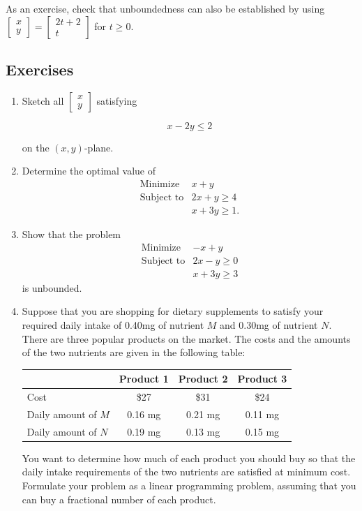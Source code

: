 As an exercise, check that unboundedness can also be established by
using
\(\begin{bmatrix} x \\ y\end{bmatrix} = \begin{bmatrix} 2t+2 \\ t\end{bmatrix}\)
for \(t \geq 0\).

\subsection*{Exercises}\label{exercises}

\begin{enumerate}
\def\labelenumi{\arabic{enumi}.}
\item
  Sketch all \(\begin{bmatrix} x \\ y \end{bmatrix}\) satisfying

  \begin{equation*}
  x - 2y \leq 2
  \end{equation*}

  on the \((x,y)\)-plane.
\item
  Determine the optimal value of \[
  \begin{array}{rl}
  \text{Minimize} & x + y \\
  \text{Subject to} &  2x + y \geq 4 \\
  & x + 3y \geq 1.
  \end{array}
  \]
\item
  Show that the problem \[
  \begin{array}{rl}
  \text{Minimize} & -x + y \\
  \text{Subject to} &  2x - y \geq 0 \\
  & x + 3y \geq 3
  \end{array}
  \] is unbounded.
\item
  Suppose that you are shopping for dietary supplements to satisfy your
  required daily intake of 0.40mg of nutrient \(M\) and 0.30mg of
  nutrient \(N\). There are three popular products on the market. The
  costs and the amounts of the two nutrients are given in the following
  table:

  \begin{longtable}[]{@{}lccc@{}}
  \toprule
  & Product 1 & Product 2 & Product 3\tabularnewline
  \midrule
  \endhead
  Cost & \$27 & \$31 & \$24\tabularnewline
  Daily amount of \(M\) & 0.16 mg & 0.21 mg & 0.11 mg\tabularnewline
  Daily amount of \(N\) & 0.19 mg & 0.13 mg & 0.15 mg\tabularnewline
  \bottomrule
  \end{longtable}

  You want to determine how much of each product you should buy so that
  the daily intake requirements of the two nutrients are satisfied at
  minimum cost. Formulate your problem as a linear programming problem,
  assuming that you can buy a fractional number of each product.
\end{enumerate}

